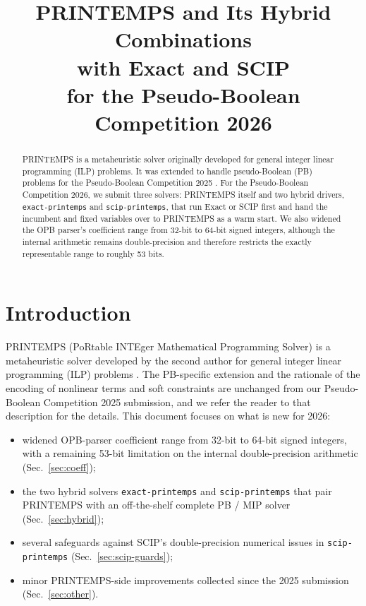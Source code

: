 \documentclass[conference]{IEEEtran}
\begin{document}
\title{\huge PRINTEMPS and Its Hybrid Combinations \\ with Exact and SCIP \\ for the Pseudo-Boolean Competition 2026}

\author{
\and
{}
}

\maketitle

\begin{abstract}
PRINTEMPS is a metaheuristic solver originally developed for general integer linear programming (ILP) problems. It was extended to handle pseudo-Boolean (PB) problems for the Pseudo-Boolean Competition 2025 \cite{printemps-pb25}. For the Pseudo-Boolean Competition 2026, we submit three solvers: PRINTEMPS itself and two hybrid drivers, \texttt{exact-printemps} and \texttt{scip-printemps}, that run Exact \cite{exact} or SCIP \cite{scip} first and hand the incumbent and fixed variables over to PRINTEMPS as a warm start. We also widened the OPB parser's coefficient range from 32-bit to 64-bit signed integers, although the internal arithmetic remains double-precision and therefore restricts the exactly representable range to roughly 53 bits.
\end{abstract}

\section{Introduction}
PRINTEMPS (PoRtable INTEger Mathematical Programming Solver) is a metaheuristic solver developed by the second author for general integer linear programming (ILP) problems \cite{printemps}. The PB-specific extension and the rationale of the encoding of nonlinear terms and soft constraints are unchanged from our Pseudo-Boolean Competition 2025 submission, and we refer the reader to that description \cite{printemps-pb25} for the details. This document focuses on what is new for 2026:
\begin{itemize}
\item widened OPB-parser coefficient range from 32-bit to 64-bit signed integers, with a remaining 53-bit limitation on the internal double-precision arithmetic (Sec.~\ref{sec:coeff});
\item the two hybrid solvers \texttt{exact-printemps} and \texttt{scip-printemps} that pair PRINTEMPS with an off-the-shelf complete PB / MIP solver (Sec.~\ref{sec:hybrid});
\item several safeguards against SCIP's double-precision numerical issues in \texttt{scip-printemps} (Sec.~\ref{sec:scip-guards});
\item minor PRINTEMPS-side improvements collected since the 2025 submission (Sec.~\ref{sec:other}).
\end{itemize}
\end{document}
